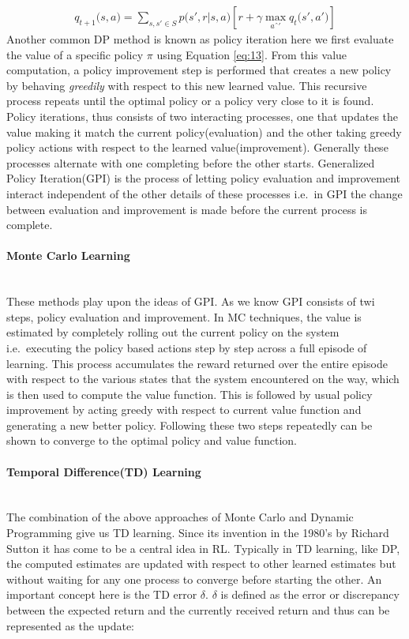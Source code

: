 \documentclass[12pt]{extarticle}
\newcommand{\myparagraph}[1]{\paragraph{#1}\mbox{}\\ \linebreak}
\numberwithin{equation}{section}
\begin{document}
	\begin{align}
	q_{t+1}\big(s,a\big) = \sum_{s,s' \in S} p\big(s',r | s,a \big)[r + \gamma \max_{aˆ'}q_t\big(s',a'\big)] \label{eq:dp-update}
	\end{align}
	Another common DP method is known as policy iteration here we first evaluate the value of a specific policy $\pi$ using Equation \ref{eq:13}. From this value computation, a policy improvement step is performed that creates a new policy by behaving \textit{greedily} with respect to this new learned value. This recursive process repeats until the optimal policy or a policy very close to it is found\cite{Sutton-introRL}.
	Policy iterations, thus consists of two interacting processes, one that updates the value making it match the current policy(evaluation) and the other taking greedy policy actions with respect to the learned value(improvement). Generally these processes alternate with one completing before the other starts. Generalized Policy Iteration(GPI) is the process of letting policy evaluation and improvement interact independent of the other details of these processes\cite{Sutton-introRL} i.e.\ in GPI the change between evaluation and improvement is made before the current process is complete.
	\myparagraph{Monte Carlo Learning }\label{mc-learning}
	These methods play upon the ideas of GPI. As we know GPI consists of twi steps, policy evaluation and improvement. In MC techniques, the value is estimated by completely rolling out the current policy on the system i.e.\ executing the policy based actions step by step across a full episode of learning. This process accumulates the reward returned over the entire episode with respect to the various states that the system encountered on the way, which is then used to compute the value function. This is followed by usual policy improvement by acting greedy with respect to current value function and generating a new better policy. Following these two steps repeatedly can be shown to converge to the optimal policy and value function.
	\myparagraph{Temporal Difference(TD) Learning }\label{td-learning}
	The combination of the above approaches of Monte Carlo and Dynamic Programming give us TD learning. Since its invention in the 1980's by Richard Sutton \cite{sutton1988TFDearning} it has come to be a central idea in RL. Typically in TD learning, like DP, the computed estimates are updated with respect to other learned estimates but without waiting for any one process to converge before starting the other. An important concept here is the TD error $\delta$. $\delta$ is defined as the error or discrepancy between the expected return and the currently  received return and thus can be represented as the update:
\end{document}
